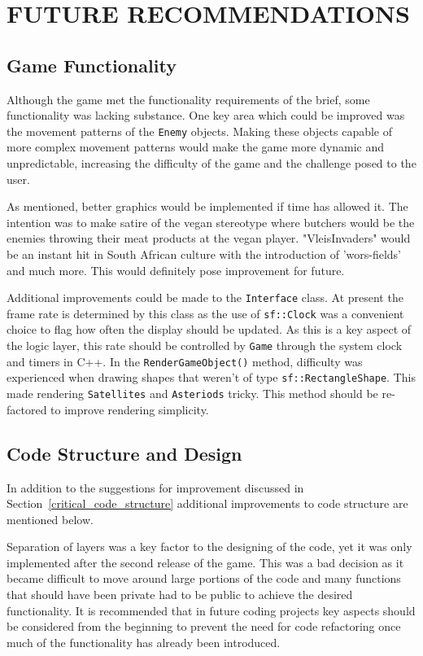 \documentclass[10pt,twocolumn]{witseiepaper}
\begin{document}
\section{FUTURE RECOMMENDATIONS}

\subsection{Game Functionality}

Although the game met the functionality requirements of the brief, some functionality was lacking substance. One key area which could be improved was the movement patterns of the \texttt{Enemy} objects. Making these objects capable of more complex movement patterns would make the game more dynamic and unpredictable, increasing the difficulty of the game and the challenge posed to the user.

As mentioned, better graphics would be implemented if time has allowed it. The intention was to make satire of the vegan stereotype where butchers would be the enemies throwing their meat products at the vegan player. "VleisInvaders" would be an instant hit in South African culture with the introduction of 'wors-fields' and much more. This would definitely pose improvement for future.

Additional improvements could be made to the \texttt{Interface} class. At present the frame rate is determined by this class as the use of \texttt{sf::Clock} was a convenient choice to flag how often the display should be updated. As this is a key aspect of the logic layer, this rate should be controlled by \texttt{Game} through the system clock and timers in C++. In the \texttt{RenderGameObject()} method, difficulty was experienced when drawing shapes that weren't of type \texttt{sf::RectangleShape}. This made rendering \texttt{Satellites} and \texttt{Asteriods} tricky. This method should be re-factored to improve rendering simplicity.

\subsection{Code Structure and Design}\label{code_improvements}

In addition to the suggestions for improvement discussed in Section~\ref{critical_code_structure} additional improvements to code structure are mentioned below.

Separation of layers was a key factor to the designing of the code, yet it was only implemented after the second release of the game. This was a bad decision as it became difficult to move around large portions of the code and many functions that should have been private had to be public to achieve the desired functionality. It is recommended that in future coding projects key aspects should be considered from the beginning to prevent the need for code refactoring once much of the functionality has already been introduced.
\end{document}
